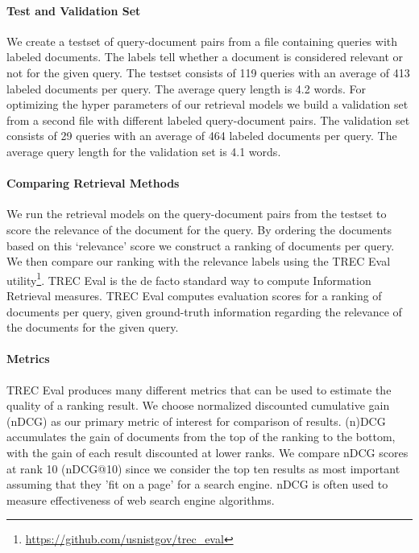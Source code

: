 
\paragraph{Test and Validation Set}

We create a testset of query-document pairs from a file
containing queries with labeled documents. The labels tell whether
a document is considered relevant or not for the given query.
The testset consists of 119 queries with an average of 
413 labeled documents per query. 
The average query length is 4.2 words.
%
For optimizing the hyper parameters of our retrieval models
we build a validation set from a second file with different 
labeled query-document pairs. 
The validation set consists of 29 queries with an average of 
464 labeled documents per query. 
The average query length for the validation set is 4.1 words.

\paragraph{Comparing Retrieval Methods}

We run the retrieval models on the query-document pairs from the
testset to score the relevance of the document for the query.
By ordering the documents based on this `relevance' score
we construct a ranking of documents per query.
We then compare our ranking with the relevance labels using
the TREC Eval utility\footnote{\url{https://github.com/usnistgov/trec_eval}}. TREC Eval is the de facto standard way to compute Information Retrieval measures. TREC Eval computes evaluation scores
for a ranking of documents per query, given
ground-truth information regarding the relevance of the documents
for the given query. 

\paragraph{Metrics}

TREC Eval produces many different metrics that can be used 
to estimate the quality of a ranking result.
We choose normalized discounted cumulative gain (nDCG) as
our primary metric of interest for comparison of results.
(n)DCG accumulates the gain of documents from the top of the ranking
to the bottom, with the gain of each result discounted at lower ranks.
We compare nDCG scores at rank 10 (nDCG@10) since we consider the top ten results as most important assuming that they 'fit on a page' for a search engine. nDCG is often used to measure effectiveness of web search engine algorithms.


